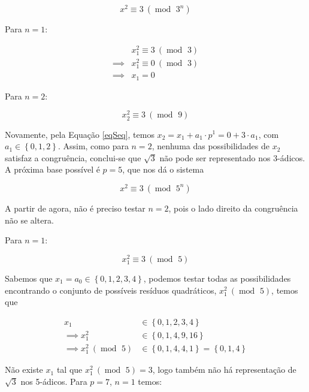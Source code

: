\documentclass{report}
\DeclareMathOperator{\modulo}{mod \ }
\theoremstyle{definition}
\begin{document}
\begin{equation*}
    x^2 \equiv 3 \ (\modulo 3^n)
\end{equation*}

Para $n=1$:

\begin{align*}
             & x_1^2 \equiv 3 \ (\modulo 3) \\
    \implies & x_1^2 \equiv 0 \ (\modulo 3) \\
    \implies & x_1 = 0
\end{align*}

Para $n=2$:

\begin{equation*}
    x_2^2 \equiv 3 \ (\modulo 9)
\end{equation*}

Novamente, pela Equação \ref{eqSeq}, temos $x_2 = x_1 + a_1 \cdot p^1 = 0 + 3 \cdot a_1$, com $a_1 \in \left\lbrace 0,1,2 \right\rbrace$. Assim, como para $n=2$, nenhuma das possibilidades de $x_2$ satisfaz a congruência, conclui-se que $\sqrt{3}$ não pode ser representado nos 3-ádicos. A próxima base possível é $p=5$, que nos dá o sistema

\begin{equation*}
    x^2 \equiv 3 \ (\modulo 5^n)
\end{equation*}

A partir de agora, não é preciso testar $n=2$, pois o lado direito da congruência não se altera.

Para $n=1$:

\begin{equation*}
    x_1^2 \equiv 3 \ (\modulo 5)
\end{equation*}

Sabemos que $x_1 = a_0 \in \left\lbrace 0,1,2,3,4 \right\rbrace$, podemos testar todas as possibilidades encontrando o conjunto de possíveis resíduos quadráticos, $x_1^2 \ (\modulo 5)$, temos que

\begin{align*}
             x_1                 &\in \left\lbrace 0,1,2,3,4 \right\rbrace\\
    \implies x_1^2               &\in \left\lbrace 0,1,4,9,16 \right\rbrace\\
    \implies x_1^2 \ (\modulo 5) &\in \left\lbrace 0,1,4,4,1 \right\rbrace = \left\lbrace 0,1,4 \right\rbrace
\end{align*}

Não existe $x_1$ tal que $x_1^2 \ (\modulo 5)=3$, logo também não há representação de $\sqrt{3}$ nos 5-ádicos. Para $p=7$, $n=1$ temos:
\end{document}
